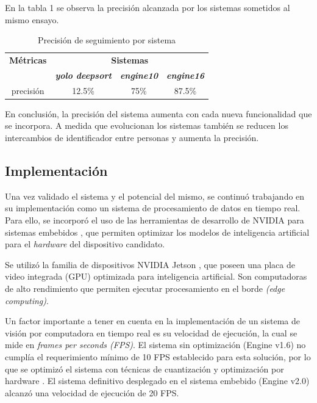 \documentclass[conference]{IEEEtran}
\begin{document}
En la tabla 1 se observa la precisión alcanzada por los sistemas sometidos al mismo ensayo.

\begin{table}[htbp]
\caption{Precisión de seguimiento por sistema}
\begin{center}
\begin{tabular}{|c|c|c|c|}
\hline
\textbf{Métricas}&\multicolumn{3}{|c|}{\textbf{Sistemas}} \\
\cline{2-4}
\textbf{} & \textbf{\textit{yolo deepsort}}& \textbf{\textit{engine10}}& \textbf{\textit{engine16}} \\
\hline
precisión & 12.5\% & 75\% & 87.5\% \\
\hline
\end{tabular}
\label{tab1}
\end{center}
\end{table}

En conclusión, la precisión del sistema aumenta con cada nueva funcionalidad que se incorpora. A medida que evolucionan los sistemas también se reducen los intercambios de identificador entre personas y aumenta la precisión.

\subsection{Implementación}

Una vez validado el sistema y el potencial del mismo, se continuó trabajando en su implementación como un sistema de procesamiento de datos en tiempo real. Para ello, se incorporó el uso de las herramientas de desarrollo de NVIDIA para sistemas embebidos \cite{b18}, que permiten optimizar los modelos de inteligencia artificial para el \textit{hardware} del dispositivo candidato.

Se utilizó la familia de dispositivos NVIDIA Jetson \cite{b19}, que poseen una placa de video integrada (GPU) optimizada para inteligencia artificial. Son computadoras de alto rendimiento que permiten ejecutar procesamiento en el borde \textit{(edge computing)}.

Un factor importante a tener en cuenta en la implementación de un sistema de visión por computadora en tiempo real es su velocidad de ejecución, la cual se mide en \textit{frames per seconds (FPS)}\cite{b20}. El sistema sin optimización (Engine v1.6) no cumplía el requerimiento mínimo de 10 FPS establecido para esta solución, por lo que se optimizó el sistema  con técnicas de cuantización y optimización por hardware \cite{b21}. El sistema definitivo desplegado en el sistema embebido (Engine v2.0) alcanzó una velocidad de ejecución de 20 FPS.
\end{document}
